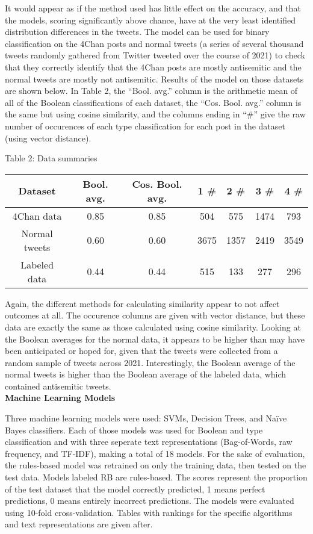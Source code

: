 \documentclass{article}
\begin{document}
It would appear as if the method used has little effect on the accuracy, and that the models, scoring significantly above chance, have at the very least identified distribution differences in the tweets. The model can be used for binary classification on the 4Chan posts and normal tweets (a series of several thousand tweets randomly gathered from Twitter tweeted over the course of 2021) to check that they correctly identify that the 4Chan posts are mostly antisemitic and the normal tweets are mostly not antisemitic. Results of the model on those datasets are shown below. In Table 2, the ``Bool. avg.'' column is the arithmetic mean of all of the Boolean classifications of each dataset, the ``Cos. Bool. avg.'' column is the same but using cosine similarity, and the columns ending in ``\#'' give the raw number of occurences of each type classification for each post in the dataset (using vector distance).
\begin{center}
Table 2: Data summaries\\
\begin{tabular}{ |c|c|c|c|c|c|c|}
\hline {\bf Dataset} & {\bf Bool. avg.} & {\bf Cos. Bool. avg.} & {\bf 1 \#} & {\bf 2 \#} & {\bf 3 \#} & {\bf 4 \#}\\
\hline 4Chan data & 0.85 & 0.85 & 504 & 575 & 1474 & 793\\
\hline Normal tweets & 0.60 & 0.60 & 3675 & 1357 & 2419 & 3549\\
\hline Labeled data & 0.44 & 0.44 & 515 & 133 & 277 & 296\\
\hline
\end{tabular}
\end{center}

Again, the different methods for calculating similarity appear to not affect outcomes at all. The occurence columns are given with vector distance, but these data are exactly the same as those calculated using cosine similarity. Looking at the Boolean averages for the normal data, it appears to be higher than may have been anticipated or hoped for, given that the tweets were collected from a random sample of tweets across 2021. Interestingly, the Boolean average of the normal tweets is higher than the Boolean average of the labeled data, which contained antisemitic tweets.\\

{\bf Machine Learning Models}

Three machine learning models were used: SVMs, Decision Trees, and Naïve Bayes classifiers. Each of those models was used for Boolean and type classification and with three seperate text representations (Bag-of-Words, raw frequency, and TF-IDF), making a total of 18 models. For the sake of evaluation, the rules-based model was retrained on only the training data, then tested on the test data. Models labeled RB are rules-based. The scores represent the proportion of the test dataset that the model correctly predicted, 1 means perfect predictions, 0 means entirely incorrect predictions. The models were evaluated using 10-fold cross-validation. Tables with rankings for the specific algorithms and text representations are given after.
\end{document}
